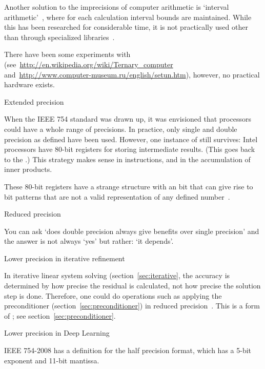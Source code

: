 Another solution to the imprecisions of computer arithmetic is `interval
arithmetic'~\cite{wikipedia:interval-arithmetic}, where for each
calculation interval bounds are maintained. While this has been
researched for considerable time, it is not practically used other
than through specialized libraries~\cite{boost:interval-arithmetic}.

There have been some experiments with 
(see~\url{http://en.wikipedia.org/wiki/Ternary_computer}
and~\url{http://www.computer-museum.ru/english/setun.htm}), however,
no practical hardware exists.

 {Extended precision}
\label{sec:ext-prec}

When the IEEE 754 standard was drawn up, it was envisioned that 
processors could have a whole range of precisions. In practice,
only single and double precision as defined have been used.
However, one instance of  still survives:
Intel processors have 80-bit registers for storing intermediate results.
(This goes back to the .)
This strategy makes sense in  instructions, 
and in the accumulation of inner products.

These 80-bit registers have a strange structure
with an  bit
that can give rise to bit patterns that are not 
a valid representation of any defined number~\cite{mostlyharmless80bit}.

 {Reduced precision}

You can ask `does double precision always give benefits over single
precision' and the answer is not always `yes' but rather: `it
depends'.

 {Lower precision in iterative refinement}

In iterative linear system solving (section~\ref{sec:iterative}, the
accuracy is determined by how precise the residual is calculated, not
how precise the solution step is done. Therefore, one could do
operations such as applying the preconditioner
(section~\ref{sec:preconditioner}) in reduced
precision~\cite{Dongarra:mixed-refinement}. This is a form of
; see
section~\ref{sec:preconditioner}.

 {Lower precision in Deep Learning}
\label{sec:arith-bfloat}

IEEE 754-2008 has a definition for the  half
precision format, which has a 5-bit exponent and 11-bit mantissa.

